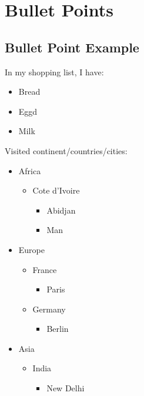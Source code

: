 \documentclass[10pt]{report}
\begin{document}
\chapter{Bullet Points}

\section{Bullet Point Example}


In my shopping list, I have:

\begin{itemize}
\item Bread
\item Eggd

\item Milk

\end{itemize}


Visited continent/countries/cities:

\begin{itemize}
\item Africa
\begin{itemize}
\item Cote d'Ivoire

\begin{itemize}
\item Abidjan

\item Man

\end{itemize}
\end{itemize}
\item Europe

\begin{itemize}
\item France

\begin{itemize}
\item Paris

\end{itemize}
\item Germany

\begin{itemize}
\item Berlin

\end{itemize}
\end{itemize}
\item Asia

\begin{itemize}
\item India

\begin{itemize}
\item New Delhi

\end{itemize}
\end{itemize}
\end{itemize}
\end{document}
